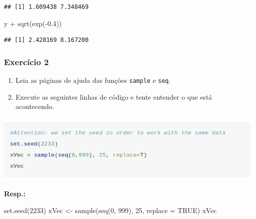 \documentclass[
]{article}
\newenvironment{Shaded}{\begin{snugshade}}{\end{snugshade}}
\newcommand{\AttributeTok}[1]{\textcolor[rgb]{0.77,0.63,0.00}{#1}}
\newcommand{\ConstantTok}[1]{\textcolor[rgb]{0.00,0.00,0.00}{#1}}
\newcommand{\DecValTok}[1]{\textcolor[rgb]{0.00,0.00,0.81}{#1}}
\newcommand{\FloatTok}[1]{\textcolor[rgb]{0.00,0.00,0.81}{#1}}
\newcommand{\FunctionTok}[1]{\textcolor[rgb]{0.00,0.00,0.00}{#1}}
\newcommand{\NormalTok}[1]{#1}
\newcommand{\OtherTok}[1]{\textcolor[rgb]{0.56,0.35,0.01}{#1}}
\newcommand{\SpecialCharTok}[1]{\textcolor[rgb]{0.00,0.00,0.00}{#1}}
\begin{document}
\begin{itemize}
\begin{verbatim}
## [1] 1.609438 7.348469
\end{verbatim}

\begin{Shaded}
\begin{Highlighting}[]
\NormalTok{y }\SpecialCharTok{+} \FunctionTok{sqrt}\NormalTok{(}\FunctionTok{exp}\NormalTok{(}\SpecialCharTok{{-}}\FloatTok{0.4}\NormalTok{))}
\end{Highlighting}
\end{Shaded}

\begin{verbatim}
## [1] 2.428169 8.167200
\end{verbatim}
\end{itemize}

\hypertarget{exercuxedcio-2}{%
\subsubsection{Exercício 2}\label{exercuxedcio-2}}

\begin{enumerate}
\def\labelenumi{\arabic{enumi}.}
\item
  Leia as páginas de ajuda das funções \texttt{sample} e \texttt{seq}.
\item
  Execute as seguintes linhas de código e tente entender o que está acontecendo.
\end{enumerate}

\begin{center}\includegraphics[width=0.8\linewidth,]{img/lab1-exerc2-2-1} \end{center}

\textbf{Resp.:}

\begin{Shaded}
\begin{Highlighting}[]
\FunctionTok{set.seed}\NormalTok{(}\DecValTok{2233}\NormalTok{)}
\NormalTok{xVec }\OtherTok{\textless{}{-}} \FunctionTok{sample}\NormalTok{(}\FunctionTok{seq}\NormalTok{(}\DecValTok{0}\NormalTok{, }\DecValTok{999}\NormalTok{), }\DecValTok{25}\NormalTok{, }\AttributeTok{replace =} \ConstantTok{TRUE}\NormalTok{)}
\NormalTok{xVec}
\end{Highlighting}
\end{Shaded}
\end{document}
